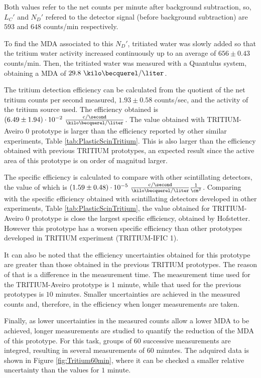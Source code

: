 Both values refer to the net counts per minute after background subtraction, so, $L_C'$ and $N_D'$ refered to the detector signal (before background subtraction) are $593$ and $648$ counts/min respectively.

To find the MDA associated to this $N_D'$, tritiated water was slowly added  so that the tritium water activity increased continuously up to an average of $656 \pm 0.43$ counts/min. Then, the tritiated water was measured with a Quantulus system, obtaining a MDA of $29.8~\kilo\becquerel/\liter$.

The tritium detection efficiency can be calculated from the quotient of the net tritium counts per second measured, $1.93 \pm 0.58$ counts/sec, and the activity of the tritium source used. The efficiency obtained is $(6.49 \pm 1.94)\cdot{} 10^{-2}~ \frac{\text{c}/\second}{\kilo\becquerel/\liter}$.  The value obtained with TRITIUM-Aveiro 0 prototype is larger than the efficiency reported by other similar experiments, Table \ref{tab:PlasticScinTritium}. This is also larger than the efficiency obtained with previous TRITIUM prototypes, an expected result since the active area of this prototype is on order of magnitud larger.

The specific efficiency is calculated to compare with other scintillating detectors, the value of which is $(1.59 \pm 0.48)\cdot{} 10^{-5}~ \frac{\text{c}/\second}{\kilo\becquerel/\liter}\frac{1}{\cm^{2}}$. Comparing with the specific efficiency obtained with scintillating detectors developed in other experiments, Table \ref{tab:PlasticScinTritium}, the value obtained for TRITIUM-Aveiro 0 prototype is close the largest specific efficiency, obtained by Hofstetter. However this prototype has a worsen specific efficiency than other prototypes developed in TRITIUM experiment (TRITIUM-IFIC 1). 

It can also be noted that the efficiency uncertainties obtained for this prototype are greater than those obtained in the previous TRITIUM prototypes. The reason of that is a difference in the measurement time. The measurement time used for the TRITIUM-Aveiro prototype is $1$ minute, while that used for the previous prototypes is $10$ minutes. Smaller uncertainties are achieved in the measured counts and, therefore, in the efficiency when longer measurements are taken.

Finally, as lower uncertainties in the measured counts allow a lower MDA to be achieved, longer measurements are studied to quantify the reduction of the MDA of this prototype. For this task, groups of 60 successive measurements are integred, resulting in several measurements of 60 minutes. The adquired data is shown in Figure \ref{fig:Tritium60min}, where it can be checked a smaller relative uncertainty than the values for $1$ minute.

